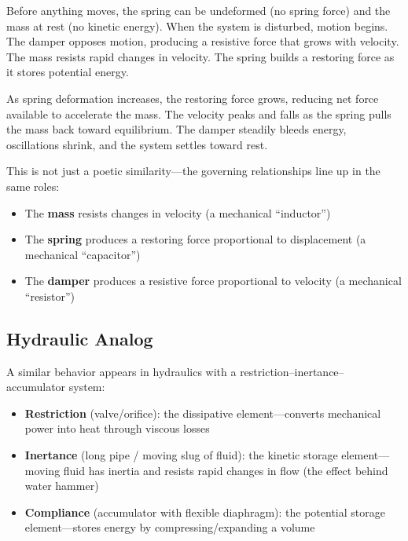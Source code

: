 \documentclass[
]{article}
\providecommand{\tightlist}{%
  \setlength{\itemsep}{0pt}\setlength{\parskip}{0pt}}
\begin{document}
Before anything moves, the spring can be undeformed (no spring force)
and the mass at rest (no kinetic energy). When the system is disturbed,
motion begins. The damper opposes motion, producing a resistive force
that grows with velocity. The mass resists rapid changes in velocity.
The spring builds a restoring force as it stores potential energy.

As spring deformation increases, the restoring force grows, reducing net
force available to accelerate the mass. The velocity peaks and falls as
the spring pulls the mass back toward equilibrium. The damper steadily
bleeds energy, oscillations shrink, and the system settles toward rest.

This is not just a poetic similarity---the governing relationships line
up in the same roles:

\begin{itemize}
\tightlist
\item
  The \textbf{mass} resists changes in velocity (a mechanical
  ``inductor'')
\item
  The \textbf{spring} produces a restoring force proportional to
  displacement (a mechanical ``capacitor'')
\item
  The \textbf{damper} produces a resistive force proportional to
  velocity (a mechanical ``resistor'')
\end{itemize}

\subsection{Hydraulic Analog}\label{hydraulic-analog}

A similar behavior appears in hydraulics with a
restriction--inertance--accumulator system:

\begin{itemize}
\tightlist
\item
  \textbf{Restriction} (valve/orifice): the dissipative
  element---converts mechanical power into heat through viscous losses
\item
  \textbf{Inertance} (long pipe / moving slug of fluid): the kinetic
  storage element---moving fluid has inertia and resists rapid changes
  in flow (the effect behind water hammer)
\item
  \textbf{Compliance} (accumulator with flexible diaphragm): the
  potential storage element---stores energy by compressing/expanding a
  volume
\end{itemize}
\end{document}

